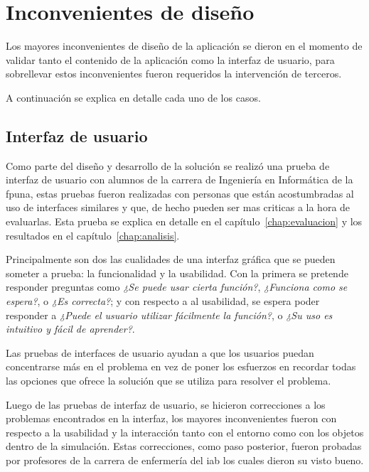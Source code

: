 \section{Inconvenientes de diseño}

Los mayores inconvenientes de diseño de la aplicación se dieron en el momento de
validar tanto el contenido de la aplicación como la interfaz de usuario, para
sobrellevar estos inconvenientes fueron requeridos la intervención de terceros.

A continuación se explica en detalle cada uno de los casos.

\subsection{Interfaz de usuario}


Como parte del diseño y desarrollo de la solución se realizó una prueba de
interfaz de usuario con alumnos de la carrera de Ingeniería en Informática de la
\Gls{fpuna}, estas pruebas fueron realizadas con personas que están
acostumbradas al uso de interfaces similares y que, de hecho pueden ser mas
criticas a la hora de evaluarlas. Esta prueba se explica en detalle en el
capítulo~\ref{chap:evaluacion} y los resultados en el
capítulo~\ref{chap:analisis}.

Principalmente son dos las cualidades de una interfaz gráfica que se pueden
someter a prueba: la funcionalidad y la usabilidad. Con la primera se pretende
responder preguntas como \textit{¿Se puede usar cierta función?},
\textit{¿Funciona como se espera?}, o \textit{¿Es correcta?}; y con respecto a
al usabilidad, se espera poder responder a \textit{¿Puede el usuario
    utilizar fácilmente la función?}, o \textit{¿Su uso es intuitivo y fácil de
    aprender?}\cite{fragaverificacion}.

Las pruebas de interfaces de usuario ayudan a que los usuarios puedan
concentrarse más en el problema en vez de poner los esfuerzos en recordar todas
las opciones que ofrece la solución que se utiliza para resolver el
problema\cite{horowitz1993graphical}.

Luego de las pruebas de interfaz de usuario, se hicieron correcciones a los
problemas encontrados en la interfaz, los mayores inconvenientes fueron con
respecto a la usabilidad y la interacción tanto con el entorno como con los
objetos dentro de la simulación. Estas correcciones, como paso posterior, fueron
probadas por profesores de la carrera de enfermería del \Gls{iab} los cuales
dieron su visto bueno.

